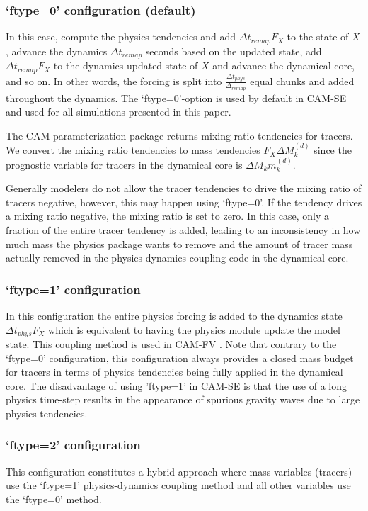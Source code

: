 \documentclass{agujournal}
\begin{document}
\subsubsection{`ftype=0' configuration (default)}
In this case, compute the physics tendencies and add $\Delta t_{remap}F_X$ to the state of $X$, advance the dynamics $\Delta t_{remap}$ seconds based on the updated state, add $\Delta t_{remap}F_X$ to the dynamics updated state of $X$ and advance the dynamical core, and so on. In other words, the forcing is split into $\frac{\Delta t_{phys}}{\Delta_{remap}}$ equal chunks and added throughout the dynamics. The `ftype=0'-option is used by default in CAM-SE and used for all simulations presented in this paper.

The CAM parameterization package returns mixing ratio tendencies for tracers. We convert the mixing ratio tendencies to mass tendencies $F_X \Delta M^{(d)}_k$ since the prognostic variable for tracers in the dynamical core is $\Delta M_k m^{(d)}_k$.

Generally modelers do not allow the tracer tendencies to drive the mixing ratio of tracers negative, however, this may happen using `ftype=0'. If the tendency drives a mixing ratio negative, the mixing ratio is set to zero. In this case, only a fraction of the entire tracer tendency is added, leading to an inconsistency in how much mass the physics package wants to remove and the amount of tracer mass actually removed in the physics-dynamics coupling code in the dynamical core.
\subsubsection{`ftype=1' configuration}
In this configuration the entire physics forcing is added to the
dynamics state $\Delta t_{phys}F_X$ which is equivalent to having the
physics module update the model state. This coupling method is used in
CAM-FV \citep{L2004MWR}. Note that contrary to the `ftype=0'
configuration, this configuration always provides a closed mass budget
for tracers in terms of physics tendencies being fully applied in the
dynamical core. The disadvantage of using 'ftype=1' in CAM-SE is that
the use of a long physics time-step results in the appearance of
spurious gravity waves due to large physics tendencies.
\subsubsection{`ftype=2' configuration}
This configuration constitutes a hybrid approach where mass variables (tracers) use the `ftype=1' physics-dynamics coupling method and all other variables use the `ftype=0' method.
\end{document}
